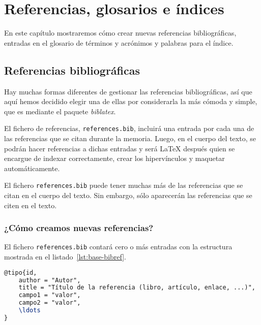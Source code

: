 \chapter{Referencias, glosarios e índices}
\label{ch:referencias}

En este capítulo mostraremos cómo crear nuevas referencias bibliográficas, entradas en el glosario de términos y acrónimos y palabras para el índice.

\section{Referencias bibliográficas}
\label{s:referencias-bibliograficas}

Hay muchas formas diferentes de gestionar las referencias bibliográficas, así que aquí hemos decidido elegir una de ellas por considerarla la más cómoda y simple, que es mediante el paquete \textit{biblatex}.

El fichero de referencias, \texttt{references.bib}, incluirá una entrada por cada una de las referencias que se citan durante la memoria. Luego, en el cuerpo del texto, se podrán hacer referencias a dichas entradas y será \LaTeX{} después quien se encargue de indexar correctamente, crear los hipervínculos y maquetar automáticamente.

El fichero \texttt{references.bib} puede tener muchas más de las referencias que se citan en el cuerpo del texto. Sin embargo, sólo aparecerán las referencias que se citen en el texto.

 
\subsection{¿Cómo creamos nuevas referencias?}

El fichero \texttt{references.bib} contará cero o más entradas con la estructura mostrada en el listado~\ref{lst:base-bibref}.

\begin{lstlisting}[language=tex,caption=Estructura general de una referencia]
@tipo{id,
    author = "Autor",
    title = "Título de la referencia (libro, artículo, enlace, ...)",
    campo1 = "valor",
    campo2 = "valor",
    \ldots
}
\end{lstlisting}

